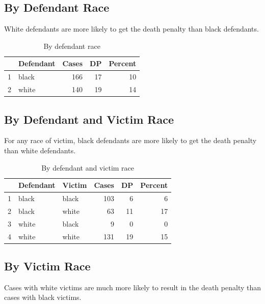 \documentclass[letterpaper, landscape]{article}
\begin{document}
  \subsection{By Defendant Race}

  White defendants are more likely to get the death penalty than black defendants.

  \begin{table}[H]
    \centering
    \begin{tabular}{rlrrr}
      \toprule
        & Defendant & Cases & DP & Percent \\
      \midrule
      1 & black     & 166   & 17 & 10 \\
      2 & white     & 140   & 19 & 14 \\
      \bottomrule
    \end{tabular}
    \caption{By defendant race}
  \end{table}

  \subsection{By Defendant and Victim Race}

  For any race of victim, black defendants are more likely to get the death penalty than white defendants.

  \begin{table}[H]
    \centering
    \begin{tabular}{rllrrr}
      \toprule
          & Defendant & Victim & Cases & DP & Percent \\
      \midrule
       1  & black     & black  & 103   & 6  & 6 \\
       2  & black     & white  & 63    & 11 & 17 \\
       3  & white     & black  & 9     & 0  & 0 \\
       4  & white     & white  & 131   & 19 & 15 \\
       \bottomrule
    \end{tabular}
    \caption{By defendant and victim race}
  \end{table}

  \subsection{By Victim Race}

  Cases with white victims are much more likely to result in the death penalty than cases with black
  victims.
\end{document}
